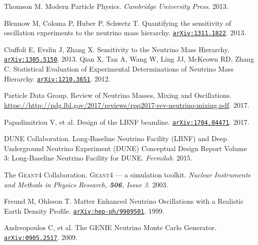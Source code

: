 \begin{thebibliography}{100}
	 Thomson M. Modern Particle Physics. \textit{Cambridge
		University Press}. 2013.


	 Blennow M, Coloma P, Huber P, Schwetz T. Quantifying the
		sensitivity of oscillation experiments to the neutrino mass hierarchy.
		\href{https://arxiv.org/pdf/1311.1822.pdf}{\texttt{arXiv:1311.1822}}. 2013.

	 Ciuffoli E, Evslin J, Zhang X. Sensitivity to the
		Neutrino Mass Hierarchy.
		\href{https://arxiv.org/abs/1305.5150v4}{\texttt{arXiv:1305.5150}}. 2013.
	 Qian X, Tan A, Wang W, Ling JJ, McKeown RD, Zhang C.
		Statistical Evaluation of Experimental Determinations of Neutrino Mass
		Hierarchy.
		\href{https://arxiv.org/abs/1210.3651}{\texttt{arXiv:1210.3651}}. 2012.



	 Particle Data Group. Review of Neutrino Masses, Mixing and
		Oscillations.
		\url{https://http://pdg.lbl.gov/2017/reviews/rpp2017-rev-neutrino-mixing.pdf}.
		2017.


	 Papadimitriou V, et al. Design of the LBNF beamline.
		\href{https://arxiv.org/abs/1704.04471}{\texttt{arXiv:1704.04471}}. 2017.

	 DUNE Collaboration. Long-Baseline Neutrino Facility (LBNF)
		and Deep Underground Neutrino Experiment (DUNE) Conceptual Design Report
		Volume 3: Long-Baseline Neutrino Facility for DUNE. \textit{Fermilab}. 2015.





	 The \textsc{Geant4} Collaboration.
		\textsc{Geant4} --- a simulation toolkit. \textit{Nuclear Instruments and Methods in
		Physics Research, \textbf{506}, Issue 3.} 2003. 

	 Freund M, Ohlsson T. Matter Enhanced Neutrino Oscillations
		with a Realistic Earth Density Profile.
		\href{https://arxiv.org/abs/hep-ph/9909501}{\texttt{arXiv:hep-ph/9909501}}.
		1999.

	 Andreopoulos C, et al. The \textsc{GENIE} Neutrino Monte
		Carlo Generator.
		\href{https://arxiv.org/abs/0905.2517}{\texttt{arXiv:0905.2517}}. 2009.




\end{thebibliography}
